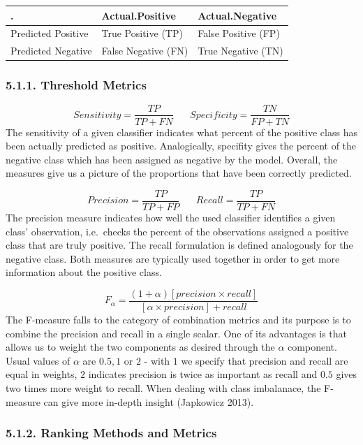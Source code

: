 \documentclass[12pt,]{article}
\begin{document}
\begin{longtable}[]{@{}lll@{}}
\toprule
. & Actual.Positive & Actual.Negative\tabularnewline
\midrule
\endhead
Predicted Positive & True Positive (TP) & False Positive
(FP)\tabularnewline
Predicted Negative & False Negative (FN) & True Negative
(TN)\tabularnewline
\bottomrule
\end{longtable}

\hypertarget{threshold-metrics}{%
\subsubsection{5.1.1. Threshold Metrics}\label{threshold-metrics}}

\[Sensitivity = \frac{TP}{TP + FN}\;\;\;\;\;\;Specificity =\frac{TN}{FP+TN} \]
The sensitivity of a given classifier indicates what percent of the
positive class has been actually predicted as positive. Analogically,
specifity gives the percent of the negative class which has been
assigned as negative by the model. Overall, the measures give us a
picture of the proportions that have been correctly predicted.

\[Precision = \frac{TP}{TP+FP}\;\;\;\;\;\;Recall=\frac{TP}{TP+FN}\] The
precision measure indicates how well the used classifier identifies a
given class' observation, i.e.~checks the percent of the observations
assigned a positive class that are truly positive. The recall
formulation is defined analogously for the negative class. Both measures
are typically used together in order to get more information about the
positive class.

\[F_\alpha=\frac{(1+\alpha)[precision \times recall]}{[\alpha\times precision] + recall}\]
The F-measure falls to the category of combination metrics and its
purpose is to combine the precision and recall in a single scalar. One
of its advantages is that allows us to weight the two components as
desired through the \(\alpha\) component. Usual values of \(\alpha\) are
\(0.5, 1\) or \(2\) - with \(1\) we specify that precision and recall
are equal in weights, \(2\) indicates precision is twice as important as
recall and \(0.5\) gives two times more weight to recall. When dealing
with class imbalanace, the F-measure can give more in-depth insight
(Japkowicz 2013).

\hypertarget{ranking-methods-and-metrics}{%
\subsubsection{5.1.2. Ranking Methods and
Metrics}\label{ranking-methods-and-metrics}}
\end{document}
